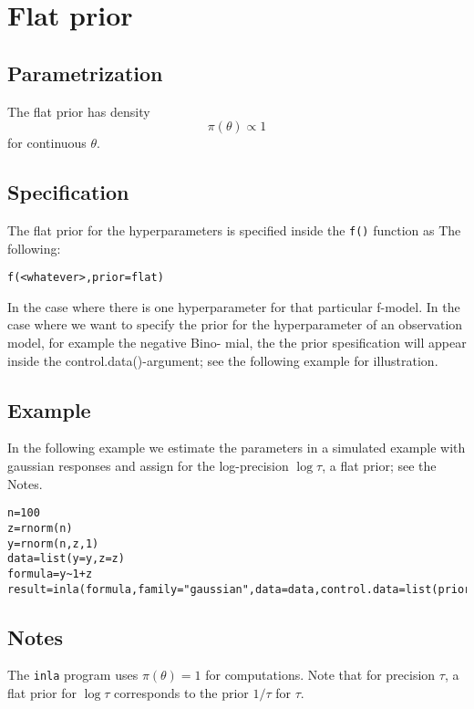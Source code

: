 \documentclass[a4paper,11pt]{article}
\begin{document}
\section*{ Flat prior}

\subsection*{Parametrization}
The flat prior has density
\begin{equation}
\pi(\theta)\propto 1
\end{equation}
for continuous $\theta$.
 
\subsection*{Specification}
The flat prior for the hyperparameters is specified inside the {\tt f()} function as The following:
\begin{center}
{\tt f(<whatever>,prior=flat)}
\end{center}
 In the case where there is one hyperparameter for that particular f-model. In the case where we want
to specify the prior for the hyperparameter of an observation model, for example the negative Bino-
mial, the the prior spesification will appear inside the control.data()-argument; see the following
example for illustration.

\subsection*{Example}

In the following example we estimate the parameters in a simulated
example with gaussian responses and assign for the log-precision
$\log\tau$, a flat prior; see the Notes.
\begin{verbatim}
n=100
z=rnorm(n)
y=rnorm(n,z,1)
data=list(y=y,z=z)
formula=y~1+z
result=inla(formula,family="gaussian",data=data,control.data=list(prior="flat"))
\end{verbatim}

\subsection*{Notes}

The {\tt inla} program uses $\pi(\theta)=1$ for computations.  Note
that for precision $\tau$, a flat prior for $\log\tau$ corresponds to
the prior $1/\tau$ for $\tau$.
\end{document}
